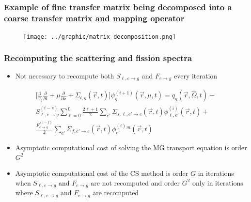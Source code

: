 \documentclass[xcolor=dvipsnames]{beamer}
\newlength{\wideitemsep}
\let\olditem\item
\renewcommand{\item}{\setlength{\itemsep}{\wideitemsep}\olditem}
\begin{document}
\begin{frame}
  \frametitle{Example of fine transfer matrix being decomposed into a coarse transfer matrix and mapping operator}

\begin{figure}[ht]
  \centering
\texttt{[image: ../graphic/matrix\_decomposition.png]}
\end{figure}
\end{frame}



\begin{frame}
  \frametitle{Recomputing the scattering and fission spectra}

\begin{itemize}
\item Not necessary to recompute both $S_{\ell,e\to g}$ and $F_{e \to g}$ every iteration
\end{itemize}
\begin{multline*}
\label{Eq.feds_transport}
\Bigg[\frac{1}{v_g} \frac{\partial}{\partial t} + \mu \frac{\partial}{\partial x} + \Sigma_{t,g}(\vec{r},t) \Bigg] \psi^{(i+1)}_g(\vec{r},\mu,t)  = q_g(\vec{r},\hat{\Omega},t) + \\ S_{\ell,e\to g}^{(i-s)} \sum_{\ell=0}^L \frac{2 \ell + 1}{2} \sum_{e'} \Sigma_{s,\ell, e' \to e}(\vec{r},t) \phi^{(i)}_{\ell,e'}(\vec{r},t) + \\  \frac{F_{e \to g}^{(i-f)}}{2} \sum_{e'} \Sigma_{f,e' \to e}(\vec{r},t) \phi^{(i)}_{e'}^m(\vec{r},t)
\end{multline*}

\begin{itemize}
\item Asymptotic computational cost of solving the MG transport equation is order $G^2$
\item Asymptotic computational cost of the CS method is order $G$ in iterations when $S_{\ell,e\to g}$ and $F_{e \to g}$ are not recomputed and order $G^2$ only in iterations where $S_{\ell,e\to g}$ and $F_{e \to g}$ are recomputed
\end{itemize}

\end{frame}
\end{document}
